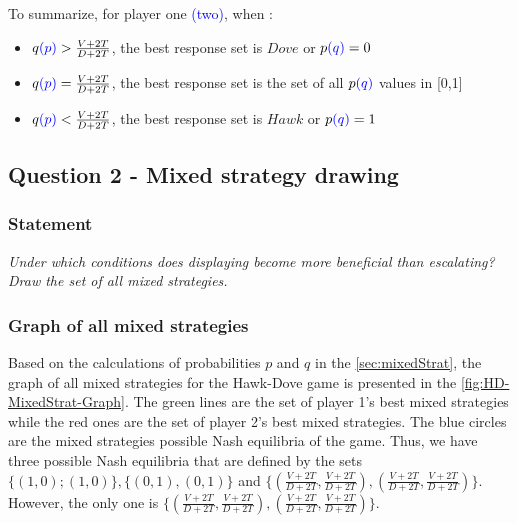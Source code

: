 \documentclass{article}
\begin{document}
To summarize, for player one \textcolor{blue}{(two)}, when :
\begin{itemize}
\item $q \textcolor{blue}{(p)} > \frac{V+2T}{D+2T}$, the best response set is {$Dove$} or $p \textcolor{blue}{(q)}=0$
\item $q \textcolor{blue}{(p)} = \frac{V+2T}{D+2T}$, the best response set is the set of all $p \textcolor{blue}{(q)}$ values in [0,1]
\item $q \textcolor{blue}{(p)} < \frac{V+2T}{D+2T}$, the best response set is {$Hawk$} or $p \textcolor{blue}{(q)} = 1 $
\end{itemize}

\subsection{Question 2 - Mixed strategy drawing}

\subsubsection*{Statement}

\textit{Under which conditions does displaying become more beneficial than escalating? Draw the set of all mixed strategies.} 

\subsubsection*{Graph of all mixed strategies}

Based on the calculations of probabilities $p$ and $q$ in the \autoref{sec:mixedStrat}, the graph of all mixed strategies for the Hawk-Dove game is presented in the \autoref{fig:HD-MixedStrat-Graph}. The green lines are the set of player 1's best mixed strategies while the red ones are the set of player 2's best mixed strategies. The blue circles are the mixed strategies possible Nash equilibria of the game. Thus, we have three possible Nash equilibria that are defined by the sets $\{(1,0);(1,0)\}, \{(0,1),(0,1)\}$ and $  \{(\frac{V+2T}{D+2T},\frac{V+2T}{D+2T}),(\frac{V+2T}{D+2T},\frac{V+2T}{D+2T})\}$. However, the only one is  $  \{(\frac{V+2T}{D+2T},\frac{V+2T}{D+2T}),(\frac{V+2T}{D+2T},\frac{V+2T}{D+2T})\}$. 
\end{document}
